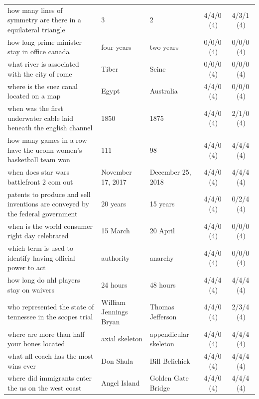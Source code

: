 \begin{longtable}{@{}p{6.6cm}p{2.9cm}p{2.9cm}cc@{}}
how many lines of symmetry are there in a equilateral triangle & 3 & 2 & 4/4/0\,\footnotesize(4) & 4/3/1\,\footnotesize(4) \\
\rowcolor{neutralgray}
how long prime minister stay in office canada & four years & two years & 0/0/0\,\footnotesize(4) & 0/0/0\,\footnotesize(4) \\
what river is associated with the city of rome & Tiber & Seine & 0/0/0\,\footnotesize(4) & 0/0/0\,\footnotesize(4) \\
\rowcolor{neutralgray}
where is the suez canal located on a map & Egypt & Australia & 4/4/0\,\footnotesize(4) & 0/0/0\,\footnotesize(4) \\
when was the first underwater cable laid beneath the english channel & 1850 & 1875 & 4/4/0\,\footnotesize(4) & 2/1/0\,\footnotesize(4) \\
\rowcolor{neutralgray}
how many games in a row have the uconn women's basketball team won & 111 & 98 & 4/4/0\,\footnotesize(4) & 4/4/4\,\footnotesize(4) \\
when does star wars battlefront 2 com out & November 17, 2017 & December 25, 2018 & 4/4/0\,\footnotesize(4) & 4/4/4\,\footnotesize(4) \\
\rowcolor{neutralgray}
patents to produce and sell inventions are conveyed by the federal government  & 20 years & 15 years & 4/4/0\,\footnotesize(4) & 0/2/4\,\footnotesize(4) \\
when is the world consumer right day celebrated & 15 March & 20 April & 4/4/0\,\footnotesize(4) & 0/0/0\,\footnotesize(4) \\
\rowcolor{neutralgray}
which term is used to identify having official power to act & authority & anarchy & 4/4/0\,\footnotesize(4) & 0/0/0\,\footnotesize(4) \\
how long do nhl players stay on waivers & 24 hours & 48 hours & 4/4/4\,\footnotesize(4) & 4/4/4\,\footnotesize(4) \\
\rowcolor{neutralgray}
who represented the state of tennessee in the scopes trial & William Jennings Bryan & Thomas Jefferson & 4/4/0\,\footnotesize(4) & 2/3/4\,\footnotesize(4) \\
where are more than half your bones located & axial skeleton & appendicular skeleton & 4/4/0\,\footnotesize(4) & 4/4/4\,\footnotesize(4) \\
\rowcolor{neutralgray}
what nfl coach has the most wins ever & Don Shula & Bill Belichick & 4/4/0\,\footnotesize(4) & 4/4/4\,\footnotesize(4) \\
where did immigrants enter the us on the west coast & Angel Island & Golden Gate Bridge & 4/4/0\,\footnotesize(4) & 4/4/4\,\footnotesize(4) \\

\end{longtable}
